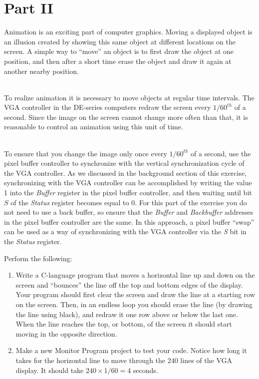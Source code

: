 \documentclass[epsfig,10pt,fullpage]{article}
\begin{document}
\newpage
\section*{Part II}
Animation is an exciting part of computer graphics. Moving a displayed object is an illusion 
created by showing this same object at different locations on the screen. A simple way to
``move'' an object is to first draw the object at one position, and then after a short time erase 
the object and draw it again at another nearby position.

~\\
To realize animation it is necessary to move objects at regular time intervals. The VGA controller 
in the DE-series computers redraw the screen every $1/60^{th}$ of a second. Since the image on 
the screen cannot change more often than that, it is reasonable to control an animation
using this unit of time.

~\\
To ensure that you change the image only once every $1/60^{th}$ of a second, use the 
pixel buffer controller to synchronize with the vertical synchronization cycle of the VGA 
controller. As we discussed in the background section of this exercise, synchronizing with the 
VGA controller can be accomplished by writing the value 1 into the {\it Buffer} register in the 
pixel buffer controller, and then waiting until bit $S$ of the {\it Status} register becomes 
equal to 0. For this part of the exercise you do not need to use a back buffer, so ensure
that the {\it Buffer} and {\it Backbuffer} addresses in the pixel buffer controller are the 
same. In this approach, a pixel buffer ``swap'' can be used as a way of synchronizing with 
the VGA controller via the {\it S} bit in the {\it Status} register.

\newpage
Perform the following:

\begin{enumerate}

\item Write a C-language program that moves a horizontal line up and down on the screen and 
``bounces'' the line off the top and bottom edges of the display. Your program should first 
clear the screen and draw the line at a starting row on the screen. Then, in an endless
loop you should erase the line (by drawing the line using black), and redraw it one row
above or below the last one.  When the line reaches the top, or bottom, of the screen 
it should start moving in the opposite direction.

\item Make a new Monitor Program project to test your code. Notice how long it takes for the 
horizontal line to move through the 240 lines of the VGA display. It should take 
$240 \times 1/60 = 4$ seconds.
\end{enumerate}
\end{document}
